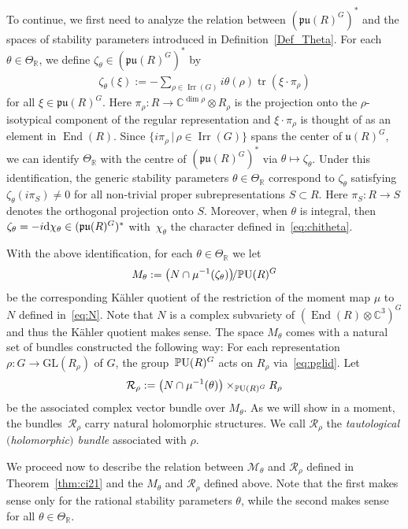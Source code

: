 \documentclass[pdftex]{sigma}
\numberwithin{equation}{section}
\newcommand{\rd}{{\rm d}}
\newcommand{\cR}{\mathcal{R}}
\newcommand{\sM}{\mathscr{M}}
\newcommand{\sR}{\mathscr{R}}
\newcommand{\fu}{{\mathfrak u}}
\newcommand{\R}{{\mathbb R}}
\newcommand{\C}{{\mathbb C}}
\newcommand{\fpu}{\mathfrak{pu}}
\newcommand{\GL}{\mathrm{GL}}
\newcommand{\PU}{{\mathbb P}{\rm U}}
\newcommand{\Irr}{\operatorname{Irr}}
\newcommand{\End}{\operatorname{End}}
\newcommand{\tr}{\operatorname{tr}}
\begin{document}
To continue, we f\/irst need to analyze the relation between
$(\fpu(R)^G)^*$ and the spaces of stability parameters introduced in
Def\/inition~\ref{Def_Theta}.  For each $\theta\in\Theta_\R$, we def\/ine
$\zeta_\theta\in(\fpu(R)^G)^*$ by
\begin{gather*}
  \zeta_\theta(\xi)
    := -\sum_{\rho\in\Irr(G)} i\theta(\rho)\tr(\xi\cdot \pi_\rho)
\end{gather*}
for all $\xi \in \fpu(R)^G$. Here $\pi_{\rho}\colon R \to \C^{\dim \rho}
\otimes R_{\rho} $ is the projection onto the $\rho$-isotypical
component of the regular representation and $\xi \cdot \pi_{\rho}$
is thought of as an element in $\End(R)$. Since $\{i\pi_\rho\,|\, \rho
\in \Irr(G)\}$ spans the center of $\fu(R)^G$, we can identify
$\Theta_{\R}$ with the centre of $(\fpu(R)^G)^*$ via
$\theta\mapsto\zeta_\theta$. Under this identif\/ication, the generic
stability parameters $\theta \in \Theta_\R$ correspond to
$\zeta_{\theta}$ satisfying $\zeta_{\theta}(i\pi_S) \neq 0$ for all
non-trivial proper subrepresentations $S \subset R$. Here $\pi_S\colon R
\to S$ denotes the orthogonal projection onto $S$.  Moreover, when
$\theta$ is integral, then $\zeta_\theta=-i\rd \chi_{\theta} \in
(\fpu(R)^G)^*$ with~$\chi_{\theta}$ the character def\/ined in~\eqref{eq:chitheta}.

With the above identif\/ication, for each $\theta \in \Theta_\R$ we let
\begin{gather}\label{eq:Mtheta-K}
  M_\theta: = \big(N\cap \mu^{-1}(\zeta_{\theta})\big)\!/ \PU(R)^G
\end{gather}
be the corresponding K\"ahler quotient of the restriction of the moment
map $\mu$ to $N$ def\/ined in~\eqref{eq:N}. Note that $N$ is a complex
subvariety of $(\End(R) \otimes \C^3)^G$ and thus the K\"ahler quotient
makes sense.  The space $M_{\theta}$ comes with a natural set of
bundles constructed the following way: For each representation
$\rho\colon G \to \GL(R_{\rho})$ of $G$, the group~$\PU(R)^G$ acts on
$R_{\rho}$ via~\eqref{eq:pglid}.  Let
\begin{gather*}%
  \cR_\rho:=\big(N\cap \mu^{-1}(\theta)\big)\times_{\PU(R)^G} R_{\rho}
\end{gather*}
be the associated complex vector bundle over $M_\theta$.  As we will
show in a moment, the bund\-les~$\cR_\rho$ carry natural holomorphic
structures.  We call $\cR_{\rho}$ the \emph{tautological $($holomorphic$)$
  bundle} associated with $\rho$.

We proceed now to describe the relation between $\sM_{\theta}$ and
$\sR_{\rho}$ def\/ined in Theorem~\ref{thm:ci21} and the $M_{\theta}$
and $\cR_{\rho}$ def\/ined above. Note that the f\/irst makes sense only
for the rational stability parameters $\theta$, while the second makes sense
for all $\theta\in\Theta_\R$.
\end{document}
